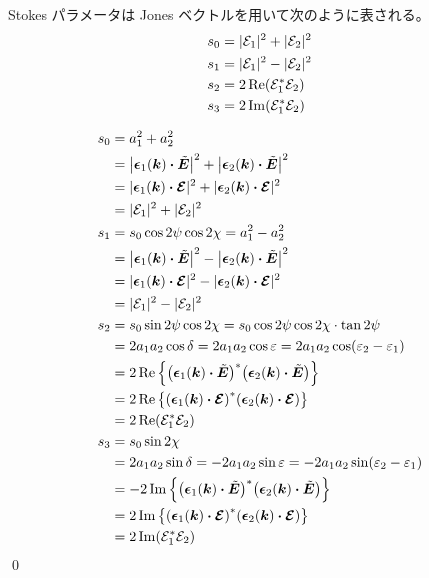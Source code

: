 \documentclass[uplatex,dvipdfmx,a4paper,11pt]{jlreq}
\makeatletter
\newcommand{\kk}{\bm{k}}
\theoremstyle{definition}
\renewenvironment{proof}[1][\proofname]{\par
  \normalfont
  \topsep6\p@\@plus6\p@ \trivlist
  \item[\hskip\labelsep{\bfseries #1}\@addpunct{\bfseries}]\ignorespaces\quad\par
}{%
  \qed\endtrivlist\@endpefalse
}
\renewcommand\proofname{証明}
\makeatother
\begin{document}
\begin{proposition}
  Stokes パラメータは Jones ベクトルを用いて次のように表される。
  \begin{align}
    s_0 & = |\mathcal{E}_1|^2 + |\mathcal{E}_2|^2 \\
    s_1 & = |\mathcal{E}_1|^2 - |\mathcal{E}_2|^2 \\
    s_2 & = 2\Re(\mathcal{E}_1^*\mathcal{E}_2)    \\
    s_3 & = 2\Im(\mathcal{E}_1^*\mathcal{E}_2)
  \end{align}
\end{proposition}
\begin{proof}
  \begin{align}
    s_0 & = a_1^2 + a_2^2                                                                              \\
        & = \qty|\ee_1(\kk)\vdot\ET|^2 + \qty|\ee_2(\kk)\vdot\ET|^2                                    \\
        & = |\ee_1(\kk)\vdot\EC|^2 + |\ee_2(\kk)\vdot\EC|^2                                            \\
        & = |\Ec_1|^2 + |\Ec_2|^2                                                                      \\
    s_1 & = s_0\cos2\psi\cos2\chi = a_1^2 - a_2^2                                                      \\
        & = \qty|\ee_1(\kk)\vdot\ET|^2 - \qty|\ee_2(\kk)\vdot\ET|^2                                    \\
        & = |\ee_1(\kk)\vdot\EC|^2 - |\ee_2(\kk)\vdot\EC|^2                                            \\
        & = |\Ec_1|^2 - |\Ec_2|^2                                                                      \\
    s_2 & = s_0\sin2\psi\cos2\chi = s_0\cos2\psi\cos2\chi\cdot\tan2\psi                                \\
        & = 2a_1a_2\cos\delta = 2a_1a_2\cos\varepsilon = 2a_1a_2\cos(\varepsilon_2 - \varepsilon_1)    \\
        & = 2\Re\qty{\qty(\ee_1(\kk)\vdot\ET)^*\qty(\ee_2(\kk)\vdot\ET)}                               \\
        & = 2\Re\qty{\qty(\ee_1(\kk)\vdot\EC)^*\qty(\ee_2(\kk)\vdot\EC)}                               \\
        & = 2\Re(\Ec_1^*\Ec_2)                                                                         \\
    s_3 & = s_0\sin2\chi                                                                               \\
        & = 2a_1a_2\sin\delta = -2a_1a_2\sin\varepsilon = - 2a_1a_2\sin(\varepsilon_2 - \varepsilon_1) \\
        & = - 2\Im\qty{\qty(\ee_1(\kk)\vdot\ET)^*\qty(\ee_2(\kk)\vdot\ET)}                             \\
        & = 2\Im\qty{\qty(\ee_1(\kk)\vdot\EC)^*\qty(\ee_2(\kk)\vdot\EC)}                               \\
        & = 2\Im(\Ec_1^*\Ec_2)
  \end{align}
\end{proof}
\end{document}
